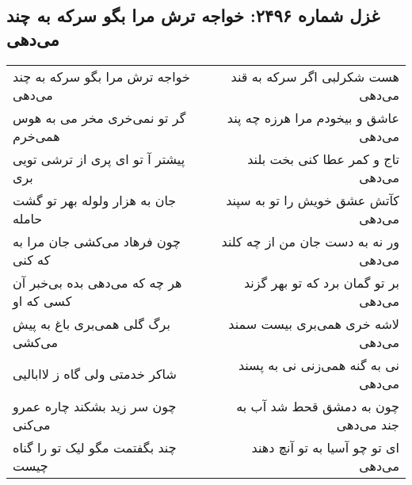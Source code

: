 \begin{center}
\section*{غزل شماره ۲۴۹۶: خواجه ترش مرا بگو سرکه به چند می‌دهی}
\label{sec:2496}
\begin{longtable}{l p{0.5cm} r}
خواجه ترش مرا بگو سرکه به چند می‌دهی
&&
هست شکرلبی اگر سرکه به قند می‌دهی
\\
گر تو نمی‌خری مخر می به هوس همی‌خرم
&&
عاشق و بیخودم مرا هرزه چه پند می‌دهی
\\
پیشتر آ تو ای پری از ترشی تویی بری
&&
تاج و کمر عطا کنی بخت بلند می‌دهی
\\
جان به هزار ولوله بهر تو گشت حامله
&&
کآتش عشق خویش را تو به سپند می‌دهی
\\
چون فرهاد می‌کشی جان مرا به که کنی
&&
ور نه به دست جان من از چه کلند می‌دهی
\\
هر چه که می‌دهی بده بی‌خبر آن کسی که او
&&
بر تو گمان برد که تو بهر گزند می‌دهی
\\
برگ گلی همی‌بری باغ به پیش می‌کشی
&&
لاشه خری همی‌بری بیست سمند می‌دهی
\\
شاکر خدمتی ولی گاه ز لاابالیی
&&
نی به گنه همی‌زنی نی به پسند می‌دهی
\\
چون سر زید بشکند چاره عمرو می‌کنی
&&
چون به دمشق قحط شد آب به جند می‌دهی
\\
چند بگفتمت مگو لیک تو را گناه چیست
&&
ای تو چو آسیا به تو آنچ دهند می‌دهی
\\
\end{longtable}
\end{center}
